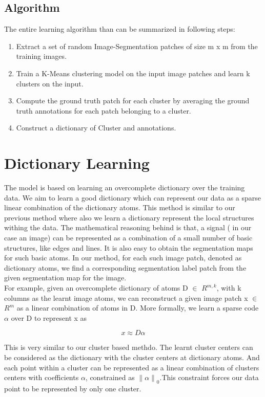 \subsection{Algorithm}
The entire learning algorithm than can be summarized in following steps:
\begin{enumerate}
\item Extract a set of random Image-Segmentation patches of size m x m from the training images.
\item Train a K-Means clustering model on the input image patches and learn k clusters on the input.
\item Compute the ground truth patch for each cluster by averaging the ground truth annotations for each patch belonging to a cluster. 
\item Construct a dictionary of Cluster and annotations.
\end{enumerate}


\section{Dictionary Learning}
The model is based on learning an overcomplete dictionary over the training data. We aim to learn a good dictionary which can represent our data as a sparse linear combination of the dictionary atoms.
This method is similar to our previous method where also we learn a dictionary represent the local structures withing the data. The mathematical reasoning behind is that, a signal ( in our case an image) can be represented as a combination of a small number of basic structures, like edges and lines.
It is also easy to obtain the segmentation maps for such basic atoms. In our method, for each such image patch, denoted as dictionary atoms, we find a corresponding segmentation label patch from the given segmentation map for the image.\\

For example, given an overcomplete dictionary of atoms D $\in$ $R^{m,k}$, with k columns as the learnt image atoms, we can reconstruct a given image patch x $\in$ $R^m$ as a linear combination of atoms in D. More formally, we learn a sparse code $\alpha$ over D to represent x as

$$ x \approx D \alpha $$  

This is very similar to our cluster based methdo. The learnt cluster centers can be considered as the dictionary with the cluster centers at dictionary atoms. And each point within a cluster can be represented as a linear combination of clusters centers with coefficients $\alpha$, constrained as ${\lVert \alpha \rVert}_0$.This constraint forces our data point to be represented by only one cluster.

